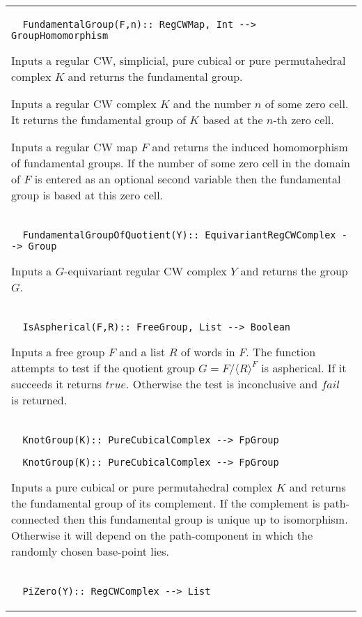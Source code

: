 \documentclass[a4paper,11pt]{report}
\begin{document}
{\begin{center}
\begin{tabular}{|l|}
\begin{verbatim}  FundamentalGroup(F,n):: RegCWMap, Int --> GroupHomomorphism
\end{verbatim}


 

 Inputs a regular CW, simplicial, pure cubical or pure permutahedral complex $K$ and returns the fundamental group. 

 Inputs a regular CW complex $K$ and the number $n$ of some zero cell. It returns the fundamental group of $K$ based at the $n$-th zero cell. 

 Inputs a regular CW map $F$ and returns the induced homomorphism of fundamental groups. If the number of
some zero cell in the domain of $F$ is entered as an optional second variable then the fundamental group is based
at this zero cell. \\
 \index{FundamentalGroupOfQuotient} 
\begin{verbatim}  FundamentalGroupOfQuotient(Y):: EquivariantRegCWComplex --> Group
\end{verbatim}


 

 Inputs a $G$-equivariant regular CW complex $Y$ and returns the group $G$. \\
 \index{IsAspherical} 
\begin{verbatim}  IsAspherical(F,R):: FreeGroup, List --> Boolean
\end{verbatim}


 

 Inputs a free group $F$ and a list $R$ of words in $F$. The function attempts to test if the quotient group $G=F/\langle R \rangle^F$ is aspherical. If it succeeds it returns $true$. Otherwise the test is inconclusive and $fail$ is returned. \\
 \index{KnotGroup} 
\begin{verbatim}  KnotGroup(K):: PureCubicalComplex --> FpGroup
\end{verbatim}
 
\begin{verbatim}  KnotGroup(K):: PureCubicalComplex --> FpGroup
\end{verbatim}


 

 Inputs a pure cubical or pure permutahedral complex $K$ and returns the fundamental group of its complement. If the complement is
path-connected then this fundamental group is unique up to isomorphism.
Otherwise it will depend on the path-component in which the randomly chosen
base-point lies. \\
 \index{PiZero} 
\begin{verbatim}  PiZero(Y):: RegCWComplex --> List
\end{verbatim}
 

\end{tabular}
\end{center}}
\end{document}
